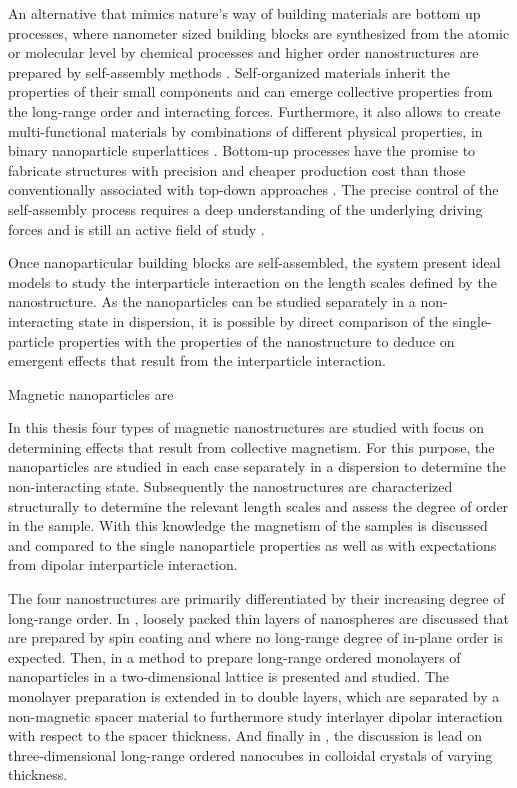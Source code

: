 \documentclass[\main/dresen_thesis.tex]{subfiles}
\begin{document}
  An alternative that mimics nature's way of building materials are bottom up processes, where nanometer sized building blocks are synthesized from the atomic or molecular level by chemical processes and higher order nanostructures are prepared by self-assembly methods \cite{Hannink_2006_Nanos, Whitesides_2002_Selfa}.
  Self-organized materials inherit the properties of their small components and can emerge collective properties from the long-range order and interacting forces.
  Furthermore, it also allows to create multi-functional materials by combinations of different physical properties, \eg in binary nanoparticle superlattices \cite{Redl_2003_Three}.
  Bottom-up processes have the promise to fabricate structures with precision and cheaper production cost than those conventionally associated with top-down approaches \cite{Hannink_2006_Nanos}.
  The precise control of the self-assembly process requires a deep understanding of the underlying driving forces and is still an active field of study \cite{Whitelam_2008_Thero, Powers_2016_Track, Josten_2017_Super}.

  Once nanoparticular building blocks are self-assembled, the system present ideal models to study the interparticle interaction on the length scales defined by the nanostructure.
  As the nanoparticles can be studied separately in a non-interacting state in dispersion, it is possible by direct comparison of the single-particle properties with the properties of the nanostructure to deduce on emergent effects that result from the interparticle interaction.

  Magnetic nanoparticles are

    In this thesis four types of magnetic nanostructures are studied with focus on determining effects that result from collective magnetism.
    For this purpose, the nanoparticles are studied in each case separately in a dispersion to determine the non-interacting state.
    Subsequently the nanostructures are characterized structurally to determine the relevant length scales and assess the degree of order in the sample.
    With this knowledge the magnetism of the samples is discussed and compared to the single nanoparticle properties as well as with expectations from dipolar interparticle interaction.

    The four nanostructures are primarily differentiated by their increasing degree of long-range order.
    In , loosely packed thin layers of nanospheres are discussed that are prepared by spin coating and where no long-range degree of in-plane order is expected.
    Then, in  a method to prepare long-range ordered monolayers of nanoparticles in a two-dimensional lattice is presented and studied.
    The monolayer preparation is extended in  to double layers, which are separated by a non-magnetic spacer material to furthermore study interlayer dipolar interaction with respect to the spacer thickness.
    And finally in , the discussion is lead on three-dimensional long-range ordered nanocubes in colloidal crystals of varying thickness.
\end{document}
